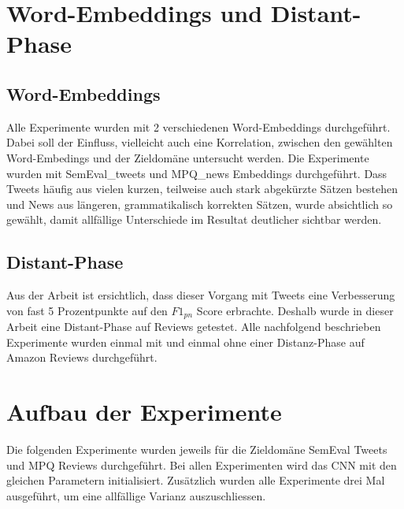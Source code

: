 \section{Word-Embeddings und Distant-Phase}
\subsection{Word-Embeddings}
Alle Experimente wurden mit 2 verschiedenen Word-Embeddings durchgeführt. Dabei soll der Einfluss, vielleicht auch eine Korrelation, zwischen den gewählten Word-Embedings und der Zieldomäne untersucht werden. Die Experimente wurden mit SemEval\_tweets und MPQ\_news Embeddings durchgeführt. Dass Tweets häufig aus vielen kurzen, teilweise auch stark abgekürzte Sätzen bestehen und News aus längeren, grammatikalisch korrekten Sätzen, wurde absichtlich so gewählt, damit allfällige Unterschiede im Resultat deutlicher sichtbar werden.
\subsection{Distant-Phase}
Aus der Arbeit \cite{deriu2016sentiment} ist ersichtlich, dass dieser Vorgang mit Tweets eine Verbesserung von fast 5 Prozentpunkte auf den $F1_{pn}$ Score erbrachte.
Deshalb wurde in dieser Arbeit eine Distant-Phase auf Reviews getestet. Alle nachfolgend beschrieben Experimente wurden einmal mit und einmal ohne einer Distanz-Phase auf Amazon Reviews durchgeführt.

\section{Aufbau der Experimente}
\label{experiments}
Die folgenden Experimente wurden jeweils für die Zieldomäne SemEval Tweets und MPQ Reviews durchgeführt. Bei allen Experimenten wird das CNN mit den gleichen Parametern initialisiert. Zusätzlich wurden alle Experimente drei Mal ausgeführt, um eine allfällige Varianz auszuschliessen.
